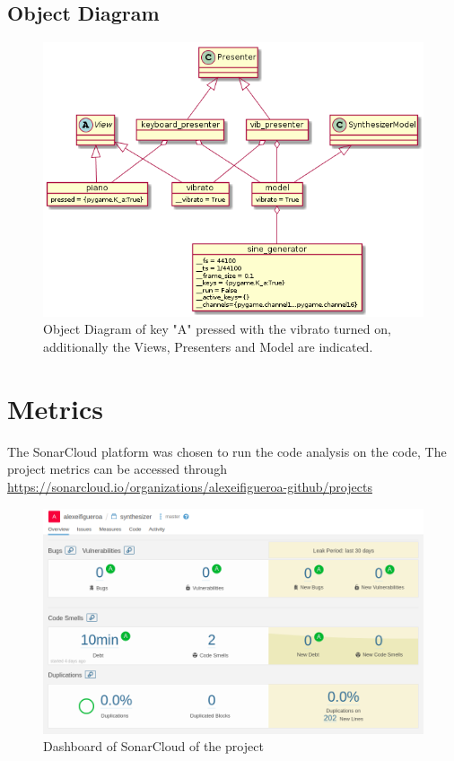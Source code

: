 \documentclass[margin,line,a4paper,authoryear,12pt]{report}
\begin{document}
\section{Object Diagram}
\begin{figure}[h!]
    \centering
    \includegraphics[width=0.8\linewidth]{UML/ObjectDiagram.png}
    \caption{Object Diagram of key "A" pressed with the vibrato turned on, additionally the Views, Presenters and Model are indicated.}
    \label{fig:ObjectDiagram}
\end{figure}
\chapter{Metrics}
The SonarCloud platform was chosen to run the code analysis on the code, The project metrics can be accessed through
\url{https://sonarcloud.io/organizations/alexeifigueroa-github/projects}

\begin{figure}[h!]
    \centering
    \includegraphics[width=0.8\linewidth]{SonarCloud.png}
    \caption{Dashboard of SonarCloud of the project}
    \label{fig:SonarCloud}
\end{figure}
\end{document}
